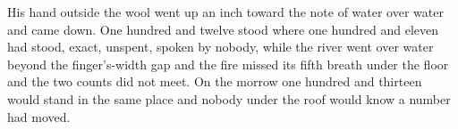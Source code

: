 His hand outside the wool went up an inch toward the note of water over water and came down. One hundred and twelve stood where one hundred and eleven had stood, exact, unspent, spoken by nobody, while the river went over water beyond the finger's-width gap and the fire missed its fifth breath under the floor and the two counts did not meet. On the morrow one hundred and thirteen would stand in the same place and nobody under the roof would know a number had moved.
